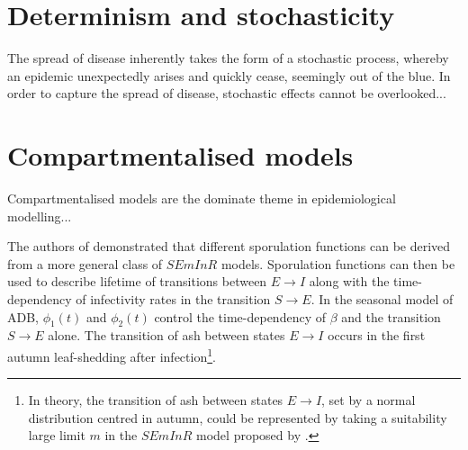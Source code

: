 \section{Determinism and stochasticity}

The spread of disease inherently takes the form of a stochastic process, whereby an epidemic unexpectedly arises and quickly cease, seemingly out of the blue. In order to capture the spread of disease, stochastic effects cannot be overlooked... 



\section{Compartmentalised models}
\label{ch2:lit-rev-compartmentalised-models}
Compartmentalised models are the dominate theme in epidemiological modelling...

\cite{segarra2001epidemic}

The authors of \cite{time-varying-infectivity} demonstrated that different sporulation functions can be derived from a more general class of $SEmInR$ models. 
Sporulation functions can then be used to describe lifetime of transitions between $E\rightarrow I$ along with the time-dependency of infectivity rates in the transition $S\rightarrow E$. 
In the seasonal model of ADB, $\phi_1(t)$ and $\phi_2(t)$ control the time-dependency of $\beta$ and the transition $S\rightarrow E$ alone.
The transition of ash between states $E\rightarrow I$ occurs in the first autumn leaf-shedding after infection\footnote{In theory, the transition of ash between states $E\rightarrow I$, set by a normal distribution centred in autumn, could be represented by taking a suitability large limit $m$ in the $SEmInR$ model proposed by \cite{time-varying-infectivity}.}. 


